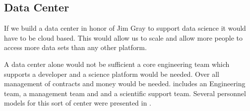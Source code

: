 \subsection{Data Center} \label{sec:dc}

If we build a data center in honor of Jim Gray to support data science  it would have to be cloud based.
This would allow us to scale and allow more people to access more data sets than any other platform.

A data center alone would not be sufficient a core engineering team which supports a developer and a science platform would be needed.
Over all management of contracts and money would be needed.
 includes an Engineering team, a management team and and a scientific support team.
Several personnel models for this sort of center were presented in \cite{2023arXiv231104272B}.






